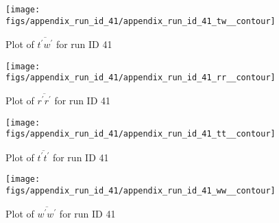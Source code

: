 \begin{figure}[H]
\centering
\texttt{[image: figs/appendix\_run\_id\_41/appendix\_run\_id\_41\_tw\_\_contour]}
\caption{Plot of $\overline{t^\prime w^\prime}$ for run ID 41}
\label{fig:appendix_run_id_41_tw__contour}
\end{figure}


\begin{figure}[H]
\centering
\texttt{[image: figs/appendix\_run\_id\_41/appendix\_run\_id\_41\_rr\_\_contour]}
\caption{Plot of $\overline{r^\prime r^\prime}$ for run ID 41}
\label{fig:appendix_run_id_41_rr__contour}
\end{figure}


\begin{figure}[H]
\centering
\texttt{[image: figs/appendix\_run\_id\_41/appendix\_run\_id\_41\_tt\_\_contour]}
\caption{Plot of $\overline{t^\prime t^\prime}$ for run ID 41}
\label{fig:appendix_run_id_41_tt__contour}
\end{figure}


\begin{figure}[H]
\centering
\texttt{[image: figs/appendix\_run\_id\_41/appendix\_run\_id\_41\_ww\_\_contour]}
\caption{Plot of $\overline{w^\prime w^\prime}$ for run ID 41}
\label{fig:appendix_run_id_41_ww__contour}
\end{figure}


